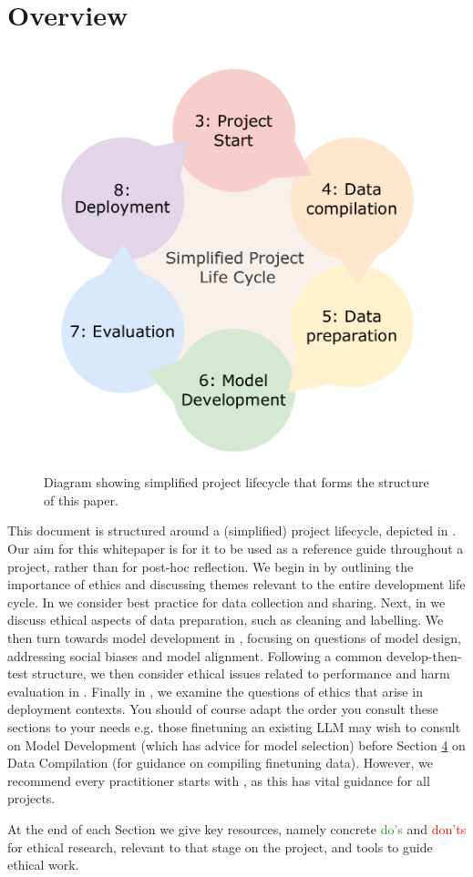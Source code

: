 \section{Overview}
\begin{figure}
    \centering
    \includegraphics[scale=0.4]{whitepaperstructure.pdf}
    \caption{Diagram showing simplified project lifecycle that forms the structure of this paper.}
    \label{fig:paperstructure}
\end{figure}
This document is structured around a (simplified) project lifecycle, depicted in . Our aim for this whitepaper is for it to be used as a reference guide throughout a project, rather than for post-hoc reflection. We begin in  by outlining the importance of ethics and discussing themes relevant to the entire development life cycle.
In  we consider best practice for data collection and sharing.
Next, in  we discuss ethical aspects of data preparation, such as cleaning and labelling.
We then turn towards model development in , focusing on questions of model design, addressing social biases and model alignment.
Following a common develop-then-test structure, we then consider ethical issues related to performance and harm evaluation in .
Finally in , we examine the questions of ethics that arise in deployment contexts. You should of course adapt the order you consult these sections to your needs e.g. those finetuning an existing LLM may wish to consult  on Model Development (which has advice for model selection) before Section \hyperref[sec:comp]{4} on Data Compilation (for guidance on compiling finetuning data). However, we recommend every practitioner starts with , as this has vital guidance for all projects. 

At the end of each Section we give key resources, namely concrete \textcolor{ForestGreen}{do's} and \textcolor{red}{don'ts} for ethical research, relevant to that stage on the project, and tools to guide ethical work. 


